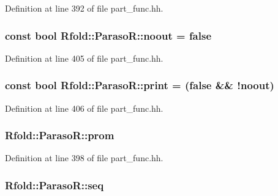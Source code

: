 Definition at line 392 of file part\+\_\+func.\+hh.

\hypertarget{class_rfold_1_1_paraso_r_af4875402eee0ce6bfd06e1cd35ea1c4a}{
\subsubsection[{noout}]{\setlength{\rightskip}{0pt plus 5cm}const bool Rfold\+::\+Paraso\+R\+::noout = false\hspace{0.3cm}{\ttfamily [static]}}}\label{class_rfold_1_1_paraso_r_af4875402eee0ce6bfd06e1cd35ea1c4a}


Definition at line 405 of file part\+\_\+func.\+hh.

\hypertarget{class_rfold_1_1_paraso_r_a11f8ab335a786811c32a9b430fcf4d2a}{
\subsubsection[{print}]{\setlength{\rightskip}{0pt plus 5cm}const bool Rfold\+::\+Paraso\+R\+::print = (false \&\& !{\bf noout})\hspace{0.3cm}{\ttfamily [static]}}}\label{class_rfold_1_1_paraso_r_a11f8ab335a786811c32a9b430fcf4d2a}


Definition at line 406 of file part\+\_\+func.\+hh.

\hypertarget{class_rfold_1_1_paraso_r_ad4b227950cd3ec1df3581d9c474777e5}{
\subsubsection[{prom}]{ Rfold\+::\+Paraso\+R\+::prom}}\label{class_rfold_1_1_paraso_r_ad4b227950cd3ec1df3581d9c474777e5}


Definition at line 398 of file part\+\_\+func.\+hh.

\hypertarget{class_rfold_1_1_paraso_r_a5f61516d848cce0e2a93b2d3e22f63ea}{
\subsubsection[{seq}]{ Rfold\+::\+Paraso\+R\+::seq}}\label{class_rfold_1_1_paraso_r_a5f61516d848cce0e2a93b2d3e22f63ea}


